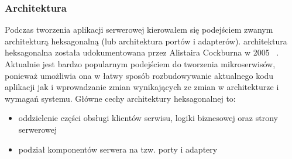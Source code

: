 \subsubsection{Architektura}
Podczas tworzenia aplikacji serwerowej kierowałem się podejściem zwanym architekturą heksagonalną (lub architektura portów i adapterów).
architektura heksagonalna została udokumentowana przez Alistaira Cockburna w 2005 ~\cite{ref_hex_doc}. Aktualnie jest bardzo popularnym podejściem do tworzenia mikroserwisów, ponieważ umożliwia ona w łatwy sposób rozbudowywanie aktualnego kodu aplikacji jak i wprowadzanie zmian wynikających ze zmian w architekturze i wymagań systemu.
Główne cechy architektury heksagonalnej to:
\begin{itemize}
  \item oddzielenie części obsługi klientów serwisu, logiki biznesowej oraz strony serwerowej
  \item podział komponentów serwera na tzw. porty i adaptery
\end{itemize}
